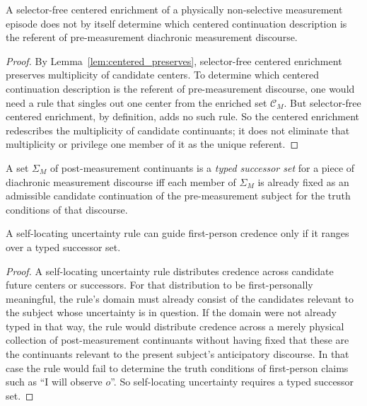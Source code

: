 \begin{proposition}
\label{prop:centered_not_enough}
A selector-free centered enrichment of a physically non-selective measurement episode does not by
itself determine which centered continuation description is the referent of pre-measurement diachronic
measurement discourse.
\end{proposition}

\begin{proof}
By Lemma~\ref{lem:centered_preserves}, selector-free centered enrichment preserves multiplicity of
candidate centers. To determine which centered continuation description is the referent of
pre-measurement discourse, one would need a rule that singles out one center from the enriched set
$\mathcal{C}_M$. But selector-free centered enrichment, by definition, adds no such rule. So the
centered enrichment redescribes the multiplicity of candidate continuants; it does not eliminate that
multiplicity or privilege one member of it as the unique referent.
\end{proof}

\begin{definition}
A set $\Sigma_M$ of post-measurement continuants is a \emph{typed successor set} for a piece of
diachronic measurement discourse iff each member of $\Sigma_M$ is already fixed as an admissible
candidate continuation of the pre-measurement subject for the truth conditions of that discourse.
\end{definition}

\begin{lemma}
\label{lem:selfloc_typed}
A self-locating uncertainty rule can guide first-person credence only if it ranges over a typed
successor set.
\end{lemma}

\begin{proof}
A self-locating uncertainty rule distributes credence across candidate future centers or successors. For
that distribution to be first-personally meaningful, the rule's domain must already consist of the
candidates relevant to the subject whose uncertainty is in question. If the domain were not already
typed in that way, the rule would distribute credence across a merely physical collection of
post-measurement continuants without having fixed that these are the continuants relevant to the
present subject's anticipatory discourse. In that case the rule would fail to determine the truth
conditions of first-person claims such as \enquote{I will observe $o$}. So self-locating uncertainty
requires a typed successor set.
\end{proof}

